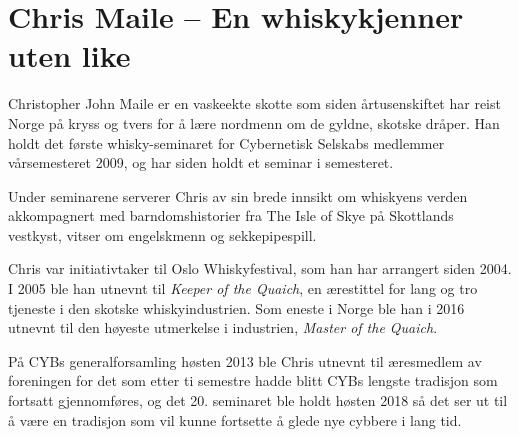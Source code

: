 \chapter{Chris Maile -- En whiskykjenner uten like}

\author{Skrevet av Torgeir Lebesbye}

Christopher John Maile er en vaskeekte skotte som siden årtusenskiftet har reist Norge på kryss og tvers for å lære nordmenn om de gyldne, skotske dråper. Han holdt det første whisky-seminaret for Cybernetisk Selskabs medlemmer vårsemesteret 2009, og har siden holdt et seminar i semesteret.

Under seminarene serverer Chris av sin brede innsikt om whiskyens verden akkompagnert med barndomshistorier fra The Isle of Skye på Skottlands vestkyst, vitser om engelskmenn og sekkepipespill.

Chris var initiativtaker til Oslo Whiskyfestival, som han har arrangert siden 2004. I 2005 ble han utnevnt til \textit{Keeper of the Quaich}, en ærestittel for lang og tro tjeneste i den skotske whiskyindustrien. Som eneste i Norge ble han i 2016 utnevnt til den høyeste utmerkelse i industrien, \textit{Master of the Quaich}.

På CYBs generalforsamling høsten 2013 ble Chris utnevnt til æresmedlem av foreningen for det som etter ti semestre hadde blitt CYBs lengste tradisjon som fortsatt gjennomføres, og det 20. seminaret ble holdt høsten 2018 så det ser ut til å være en tradisjon som vil kunne fortsette å glede nye cybbere i lang tid.
